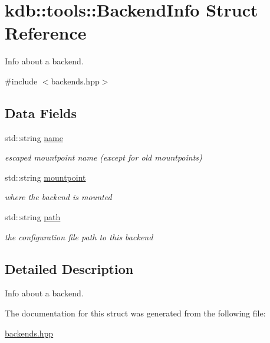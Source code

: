 \hypertarget{structkdb_1_1tools_1_1BackendInfo}{\section{kdb\+:\+:tools\+:\+:Backend\+Info Struct Reference}
\label{structkdb_1_1tools_1_1BackendInfo}
}


Info about a backend.  




{\ttfamily \#include $<$backends.\+hpp$>$}

\subsection*{Data Fields}
\begin{DoxyCompactItemize}
\item 
\hypertarget{structkdb_1_1tools_1_1BackendInfo_a7da85fc3a4bbb7412b0544aceeb9da75}{std\+::string \hyperlink{structkdb_1_1tools_1_1BackendInfo_a7da85fc3a4bbb7412b0544aceeb9da75}{name}}\label{structkdb_1_1tools_1_1BackendInfo_a7da85fc3a4bbb7412b0544aceeb9da75}

\begin{DoxyCompactList}\small\item\em escaped mountpoint name (except for old mountpoints) \end{DoxyCompactList}\item 
\hypertarget{structkdb_1_1tools_1_1BackendInfo_a043c4414dc2b41bab37efb3c878f6cb8}{std\+::string \hyperlink{structkdb_1_1tools_1_1BackendInfo_a043c4414dc2b41bab37efb3c878f6cb8}{mountpoint}}\label{structkdb_1_1tools_1_1BackendInfo_a043c4414dc2b41bab37efb3c878f6cb8}

\begin{DoxyCompactList}\small\item\em where the backend is mounted \end{DoxyCompactList}\item 
\hypertarget{structkdb_1_1tools_1_1BackendInfo_ac1d9984e01a78dba8e01dca0b91cbf30}{std\+::string \hyperlink{structkdb_1_1tools_1_1BackendInfo_ac1d9984e01a78dba8e01dca0b91cbf30}{path}}\label{structkdb_1_1tools_1_1BackendInfo_ac1d9984e01a78dba8e01dca0b91cbf30}

\begin{DoxyCompactList}\small\item\em the configuration file path to this backend \end{DoxyCompactList}\end{DoxyCompactItemize}


\subsection{Detailed Description}
Info about a backend. 

The documentation for this struct was generated from the following file\+:\begin{DoxyCompactItemize}
\item 
\hyperlink{backends_8hpp}{backends.\+hpp}\end{DoxyCompactItemize}
